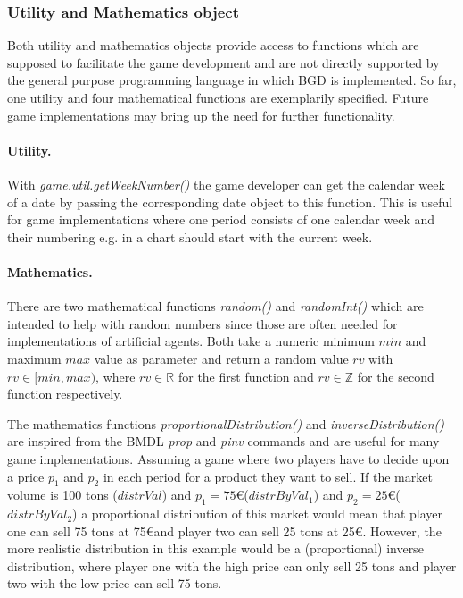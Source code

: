\subsubsection{Utility and Mathematics object}
\label{subsub:util}

Both utility and mathematics objects provide access to functions which are supposed to facilitate the game development and are not directly supported by the general purpose programming language in which BGD is implemented. So far, one utility and four mathematical functions are exemplarily specified. Future game implementations may bring up the need for further functionality.

\paragraph{Utility.} With \textit{game.util.getWeekNumber()} the game developer can get the calendar week of a date by passing the corresponding date object to this function. This is useful for game implementations where one period consists of one calendar week and their numbering e.g. in a chart should start with the current week.

\paragraph{Mathematics.} There are two mathematical functions \textit{random()} and \textit{randomInt()} which are intended to help with random numbers since those are often needed for implementations of artificial agents. Both take a numeric minimum $min$ and maximum $max$ value as parameter and return a random value $rv$ with $rv \in [min, max)$, where $rv \in \mathbb{R}$ for the first function and $rv \in \mathbb{Z}$ for the second function respectively.

The mathematics functions \textit{proportionalDistribution()} and \textit{inverseDistribution()} are inspired from the BMDL \textit{prop} and \textit{pinv} commands \cite{bmdl1} and are useful for many game implementations. Assuming a game where two players have to decide upon a price $p_1$ and $p_2$ in each period for a product they want to sell. If the market volume is 100 tons ($distrVal$) and $p_1=75$\euro \space ($distrByVal_1$) and $p_2=25$\euro \space ($distrByVal_2$) a proportional distribution of this market would mean that player one can sell 75 tons at 75\euro \space and player two can sell 25 tons at 25\euro. However, the more realistic distribution in this example would be a (proportional) inverse distribution, where player one with the high price can only sell 25 tons and player two with the low price can sell 75 tons.

